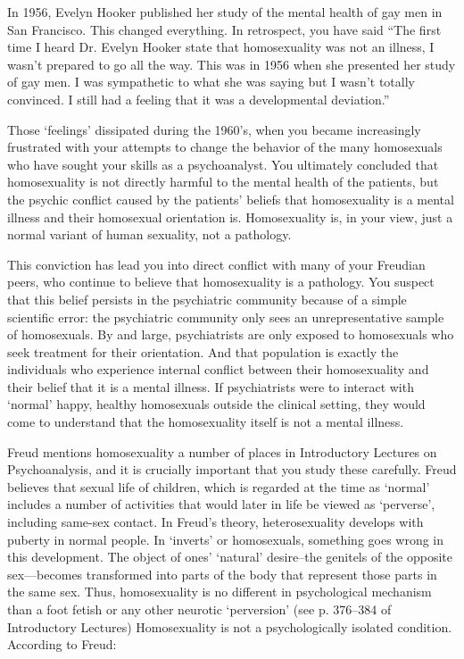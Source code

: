 In 1956, Evelyn Hooker published her study of the mental health of gay men in San Francisco. This changed everything. In retrospect, you have said ``The first time I heard Dr. Evelyn Hooker state that homosexuality was not an illness, I wasn't prepared to go all the way. This was in 1956 when she presented her study of gay men. I was sympathetic to what she was saying but I wasn't totally convinced. I still had a feeling that it was a developmental deviation.''

Those `feelings' dissipated during the 1960's, when you became increasingly frustrated with your attempts to change the behavior of the many homosexuals who have sought your skills as a psychoanalyst. You ultimately concluded that homosexuality is not directly harmful to the mental health of the patients, but the psychic conflict caused by the patients' beliefs that homosexuality is a mental illness and their homosexual orientation is. Homosexuality is, in your view, just a normal variant of human sexuality, not a pathology.

This conviction has lead you into direct conflict with many of your Freudian peers, who continue to believe that homosexuality is a pathology. You suspect that this belief persists in the psychiatric community because of a simple scientific error: the psychiatric community only sees an unrepresentative sample of homosexuals. By and large, psychiatrists are only exposed to homosexuals who seek treatment for their orientation. And that population is exactly the individuals who experience internal conflict between their homosexuality and their belief that it is a mental illness. If psychiatrists were to interact with `normal' happy, healthy homosexuals outside the clinical setting, they would come to understand that the homosexuality itself is not a mental illness.

Freud mentions homosexuality a number of places in Introductory Lectures on Psychoanalysis, and it is crucially important that you study these carefully. Freud believes that sexual life of children, which is regarded at the time as `normal' includes a number of activities that would later in life be viewed as `perverse', including same-sex contact. In Freud's theory, heterosexuality develops with puberty in normal people. In `inverts' or homosexuals, something goes wrong in this development. The object of ones' `natural' desire--the genitels of the opposite sex---becomes transformed into parts of the body that represent those parts in the same sex. Thus, homosexuality is no different in psychological mechanism than a foot fetish or any other neurotic `perversion' (see p. 376--384 of Introductory Lectures) Homosexuality is not a psychologically isolated condition. According to Freud:

